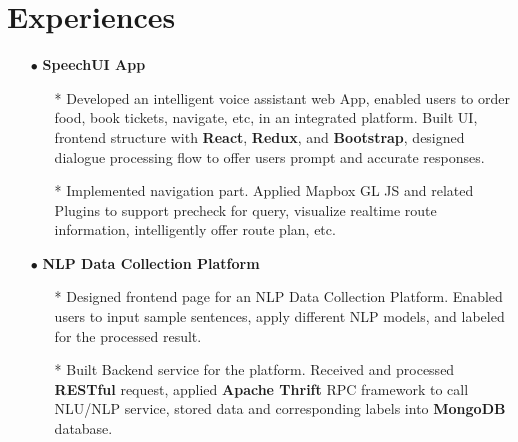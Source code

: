 \documentclass[10pt,letterpaper,sans]{moderncv} %
\begin{document}
\section{Experiences} 
\begin{itemize}
\item[$\bullet$] \textbf{SpeechUI App}
\begin{itemize}
\item[*] Developed an intelligent voice assistant web App, enabled users to order food, book tickets, navigate, etc, in an integrated platform. Built UI, frontend structure with \textbf{React}, \textbf{Redux}, and \textbf{Bootstrap}, designed dialogue processing flow to offer users prompt and accurate responses.
\item[*] Implemented navigation part. Applied Mapbox GL JS and related Plugins to support precheck for query, visualize realtime route information, intelligently offer route plan, etc.
\end{itemize}
\item[$\bullet$] \textbf{NLP Data Collection Platform}
\begin{itemize}
\item[*] Designed frontend page for an NLP Data Collection Platform. Enabled users to input sample sentences, apply different NLP models, and labeled for the processed result.
\item[*] Built Backend service for the platform. Received and processed \textbf{RESTful} request, applied \textbf{Apache Thrift} RPC framework to call NLU/NLP service, stored data and corresponding labels into \textbf{MongoDB} database. 
\end{itemize}
\end{itemize}


\end{document}
